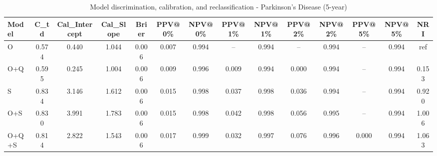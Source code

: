 \begin{table}[htbp]
\centering
\small
\caption{Model discrimination, calibration, and reclassification - Parkinson's Disease (5-year)}
\label{tab:perf_pd_5y}
\begin{tabular}{lccccccccccccc}
\toprule
Model & C\_td & Cal\_Intercept & Cal\_Slope & Brier & PPV@0\% & NPV@0\% & PPV@1\% & NPV@1\% & PPV@2\% & NPV@2\% & PPV@5\% & NPV@5\% & NRI \\
\midrule
O & 0.574 & 0.440 & 1.044 & 0.006 & 0.007 & 0.994 & -- & 0.994 & -- & 0.994 & -- & 0.994 & ref \\
O+Q & 0.595 & 0.245 & 1.004 & 0.006 & 0.009 & 0.996 & 0.009 & 0.994 & 0.000 & 0.994 & -- & 0.994 & 0.153 \\
S & 0.834 & 3.146 & 1.612 & 0.006 & 0.015 & 0.998 & 0.037 & 0.998 & 0.036 & 0.994 & -- & 0.994 & 0.920 \\
O+S & 0.830 & 3.991 & 1.783 & 0.006 & 0.015 & 0.998 & 0.042 & 0.998 & 0.056 & 0.995 & -- & 0.994 & 1.006 \\
O+Q+S & 0.814 & 2.822 & 1.543 & 0.006 & 0.017 & 0.999 & 0.032 & 0.997 & 0.076 & 0.996 & 0.000 & 0.994 & 1.063 \\
\bottomrule
\end{tabular}
\end{table}